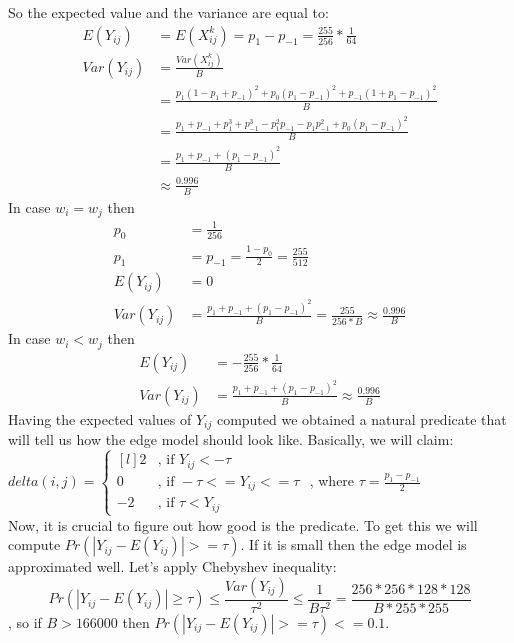 \documentclass[varwidth]{standalone}
\begin{document}
So the expected value and the variance are equal to:
\begin{align*}
E(Y_{ij}) &= E(X^k_{ij}) = p_1 - p_{-1}=\frac{255}{256}*\frac{1}{64}\\
Var(Y_{ij}) &= \frac{Var(X^k_{ij})}{B}\\
            &= \frac{p_1(1-p_1+p_{-1})^2 + p_0(p_1-p_{-1})^2 + p_{-1}(1+p_1-p_{-1})^2}{B}\\
            &= \frac{p_1 + p_{-1} + p_1^3 + p_{-1}^3 - p_1^2p_{-1} - p_1p_{-1}^2 + p_0(p_1-p_{-1})^2}{B}\\
            &= \frac{p_1 + p_{-1} + (p_1-p_{-1})^2}{B}\\
            &\approx \frac{0.996}{B}
\end{align*}
In case $w_i = w_j$ then\\
\begin{align*}
p_0 &= \frac{1}{256}\\
p_1 &= p_{-1} = \frac{1-p_0}{2} = \frac{255}{512}\\
E(Y_{ij}) &= 0\\
Var(Y_{ij}) &= \frac{p_1 + p_{-1} + (p_1-p_{-1})^2}{B} = \frac{255}{256*B} \approx \frac{0.996}{B}
\end{align*}
In case $w_i < w_j$ then\\
\begin{align*}
E(Y_{ij}) &= -\frac{255}{256}*\frac{1}{64}\\
Var(Y_{ij}) &= \frac{p_1 + p_{-1} + (p_1-p_{-1})^2}{B} \approx \frac{0.996}{B}
\end{align*}
Having the expected values of $Y_{ij}$ computed we obtained a natural predicate
that will tell us how the edge model should look like. Basically, we will
claim:\\
$delta(i, j) = \left\{
  \begin{matrix*}[l]
    2&\text{, if } Y_{ij} < -\tau\\
    0&\text{, if } -\tau <= Y_{ij} <= \tau\\
    -2&\text{, if } \tau < Y_{ij}
  \end{matrix*}\right.$ , where $\tau = \frac{p_1 - p_{-1}}{2}$\\
Now, it is crucial to figure out how good is the predicate. To get this we will
compute $Pr(|Y_{ij} - E(Y_{ij})| >= \tau)$. If it is small then the edge model
is approximated well. Let's apply Chebyshev inequality:
$$
Pr(|Y_{ij} - E(Y_{ij})| \geq \tau)
  \leq \frac{Var(Y_{ij})}{\tau^2}
  \leq \frac{1}{B\tau^2}
  = \frac{256*256*128*128}{B*255*255}
$$
, so if $B > 166000$ then $Pr(|Y_{ij} - E(Y_{ij})| >= \tau) <= 0.1$.
\end{document}
